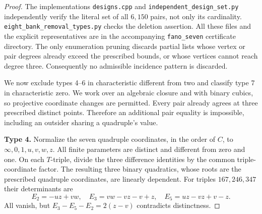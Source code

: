 \begin{proof}
The implementations \texttt{designs.cpp} and
\texttt{independent\_design\_set.py} independently verify the literal
set of all $6{,}150$ pairs, not only its cardinality.
\texttt{eight\_bank\_removal\_types.py} checks the deletion assertion.
All these files and the explicit representatives are in the accompanying
\texttt{fano\_seven} certificate directory.  The only enumeration
pruning discards partial lists whose vertex or pair degrees already
exceed the prescribed bounds, or whose vertices cannot reach degree
three.  Consequently no admissible incidence pattern is discarded.

We now exclude types 4--6 in characteristic different from two and
classify type 7 in characteristic zero.  We work over an algebraic
closure and with binary cubics, so projective coordinate changes are
permitted.  Every pair already agrees at three prescribed distinct
points.  Therefore an additional pair equality is impossible, including
an outsider sharing a quadruple's value.

\smallskip\noindent\textbf{Type 4.}
Normalize the seven quadruple coordinates, in the order of $C$, to
$\infty,0,1,u,v,w,z$.  All finite parameters are distinct and different
from zero and one.  On each $T$-triple, divide the three difference
identities by the common triple-coordinate factor.  The resulting three
binary quadratics, whose roots are the prescribed quadruple coordinates,
are linearly dependent.  For triples $167,246,347$ their determinants are
\[
 E_2=-uz+vw,\quad E_3=vw-vz-v+z,\quad E_5=uz-vz+v-z.
\]
All vanish, but $E_3-E_5-E_2=2(z-v)$ contradicts distinctness.


\end{proof}
